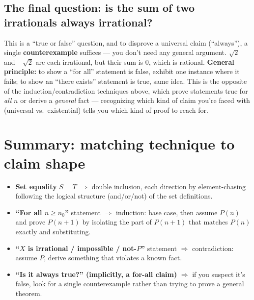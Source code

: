 \documentclass[11pt]{article}
\begin{document}
\subsection*{The final question: is the sum of two irrationals always irrational?}
This is a ``true or false'' question, and to disprove a universal
claim (``always''), a single \textbf{counterexample} suffices --- you
don't need any general argument. $\sqrt2$ and $-\sqrt2$ are each
irrational, but their sum is $0$, which is rational. \textbf{General
principle:} to show a ``for all'' statement is false, exhibit one
instance where it fails; to show an ``there exists'' statement is
true, same idea. This is the opposite of the induction/contradiction
techniques above, which prove statements true for \emph{all} $n$ or
derive a \emph{general} fact --- recognizing which kind of claim you're
faced with (universal vs.\ existential) tells you which kind of proof
to reach for.

\section*{Summary: matching technique to claim shape}
\begin{itemize}
  \item \textbf{Set equality} $S=T$ $\Rightarrow$ double inclusion,
        each direction by element-chasing following the logical
        structure (and/or/not) of the set definitions.
  \item \textbf{``For all $n \ge n_0$''} statement $\Rightarrow$
        induction: base case, then assume $P(n)$ and prove $P(n+1)$ by
        isolating the part of $P(n+1)$ that matches $P(n)$ exactly and
        substituting.
  \item \textbf{``$X$ is irrational / impossible / not-$P$''}
        statement $\Rightarrow$ contradiction: assume $P$, derive
        something that violates a known fact.
  \item \textbf{``Is it always true?'' (implicitly, a for-all claim)}
        $\Rightarrow$ if you suspect it's false, look for a single
        counterexample rather than trying to prove a general theorem.
\end{itemize}
\end{document}
